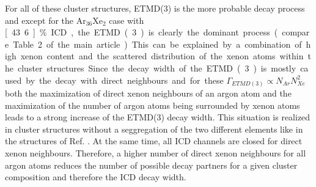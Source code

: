 For all of these cluster structures, ETMD(3) is the more probable decay process and
except for the Ar$_{36}$Xe$_2$ case with \unit[43.6]{\%} ICD, the ETMD(3) is clearly
the dominant process (compare Table 2 of the main article).
This can be explained by a combination of high xenon content and the
scattered distribution of the xenon atoms within the cluster structures.
Since the decay width of the ETMD(3) is mostly caused by the decay
with direct neighbours and for these $\Gamma_{ETMD(3)} \propto N_{Ar} N_{Xe}^2$
both the maximization of direct xenon neighbours of an argon atom and the
maximization of the number of argon atoms being surrounded by xenon atoms
leads to a strong increase of the ETMD(3) decay width. This situation is realized
in cluster structures without a seggregation of the two different elements like
in the structures of Ref. \cite{marques}. At the same time, all ICD channels are closed
for direct xenon neighbours. Therefore, a higher number of direct xenon neighbours
for all argon atoms reduces the number of possible decay partners for a given
cluster composition and therefore the ICD decay width.



%
